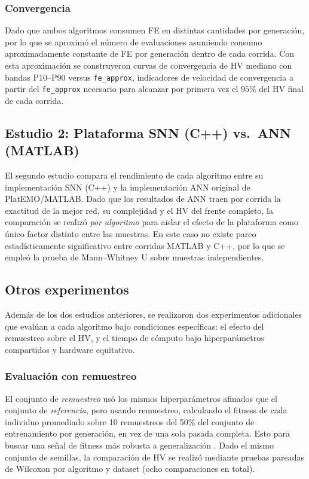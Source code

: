 \subsubsection{Convergencia}

Dado que ambos algoritmos consumen FE en distintas cantidades por generación, por lo que se aproximó el número de evaluaciones asumiendo consumo aproximadamente constante de FE por generación dentro de cada corrida. Con esta aproximación se construyeron curvas de convergencia de HV mediano con bandas P10--P90 versus \texttt{fe\_approx}, indicadores de velocidad de convergencia a partir del \texttt{fe\_approx} necesario para alcanzar por primera vez el \(95\%\) del HV final de cada corrida.

\subsection{Estudio 2: Plataforma SNN (C++) vs.\ ANN (MATLAB)}\label{sec:metodologia-estudio2}

El segundo estudio compara el rendimiento de cada algoritmo entre su implementación SNN (C++) y la implementación ANN original de PlatEMO/MATLAB. Dado que los resultados de ANN traen por corrida la exactitud de la mejor red, su complejidad y el HV del frente completo, la comparación se realizó \emph{por algoritmo} para aislar el efecto de la plataforma como único factor distinto entre las muestras. En este caso no existe pareo estadísticamente significativo entre corridas MATLAB y C++, por lo que se empleó la prueba de Mann--Whitney U sobre muestras independientes.

\subsection{Otros experimentos}\label{sec:metodologia-otros}

Además de los dos estudios anteriores, se realizaron dos experimentos adicionales que evalúan a cada algoritmo bajo condiciones específicas: el efecto del remuestreo sobre el HV, y el tiempo de cómputo bajo hiperparámetros compartidos y hardware equitativo.

\subsubsection{Evaluación con remuestreo}

El conjunto de \textit{remuestreo} usó los mismos hiperparámetros afinados que el conjunto de \textit{referencia}, pero usando remuestreo, calculando el fitness de cada individuo promediado sobre 10 remuestreos del 50\% del conjunto de entrenamiento por generación, en vez de una sola pasada completa. Esto para buscar una señal de fitness más robusta a generalización \cite{LoyolaJara2026evolvingsnn}. Dado el mismo conjunto de semillas, la comparación de HV se realizó mediante pruebas pareadas de Wilcoxon por algoritmo y dataset (ocho comparaciones en total).

